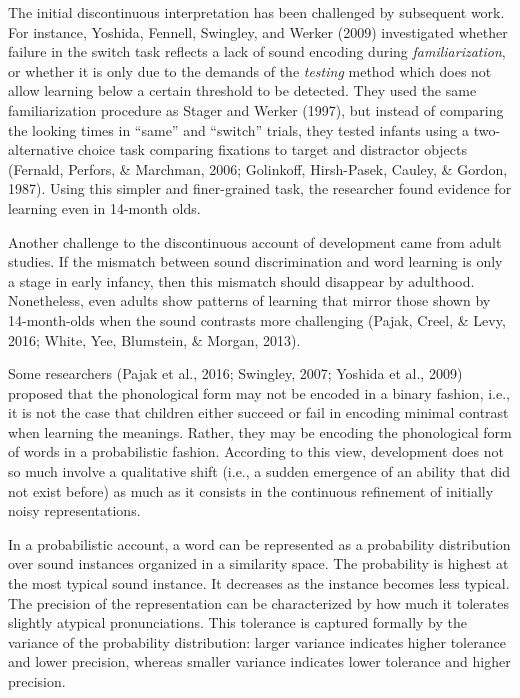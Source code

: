 \documentclass[english,,man,floatsintext]{apa6}
\theoremstyle{definition}
\theoremstyle{definition}
\theoremstyle{definition}
\theoremstyle{remark}
\begin{document}
The initial discontinuous interpretation has been challenged by
subsequent work. For instance, Yoshida, Fennell, Swingley, and Werker
(2009) investigated whether failure in the switch task reflects a lack
of sound encoding during \emph{familiarization}, or whether it is only
due to the demands of the \emph{testing} method which does not allow
learning below a certain threshold to be detected. They used the same
familiarization procedure as Stager and Werker (1997), but instead of
comparing the looking times in \enquote{same} and \enquote{switch}
trials, they tested infants using a two-alternative choice task
comparing fixations to target and distractor objects (Fernald, Perfors,
\& Marchman, 2006; Golinkoff, Hirsh-Pasek, Cauley, \& Gordon, 1987).
Using this simpler and finer-grained task, the researcher found evidence
for learning even in 14-month olds.

Another challenge to the discontinuous account of development came from
adult studies. If the mismatch between sound discrimination and word
learning is only a stage in early infancy, then this mismatch should
disappear by adulthood. Nonetheless, even adults show patterns of
learning that mirror those shown by 14-month-olds when the sound
contrasts more challenging (Pajak, Creel, \& Levy, 2016; White, Yee,
Blumstein, \& Morgan, 2013).

Some researchers (Pajak et al., 2016; Swingley, 2007; Yoshida et al.,
2009) proposed that the phonological form may not be encoded in a binary
fashion, i.e., it is not the case that children either succeed or fail
in encoding minimal contrast when learning the meanings. Rather, they
may be encoding the phonological form of words in a probabilistic
fashion. According to this view, development does not so much involve a
qualitative shift (i.e., a sudden emergence of an ability that did not
exist before) as much as it consists in the continuous refinement of
initially noisy representations.

In a probabilistic account, a word can be represented as a probability
distribution over sound instances organized in a similarity space. The
probability is highest at the most typical sound instance. It decreases
as the instance becomes less typical. The precision of the
representation can be characterized by how much it tolerates slightly
atypical pronunciations. This tolerance is captured formally by the
variance of the probability distribution: larger variance indicates
higher tolerance and lower precision, whereas smaller variance indicates
lower tolerance and higher precision.
\end{document}
